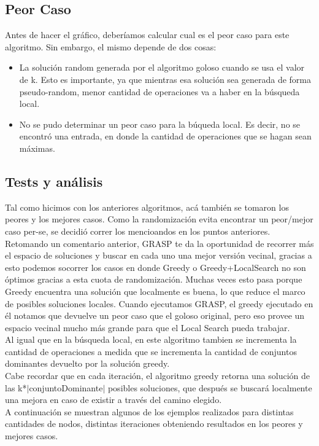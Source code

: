 \subsection{Peor Caso}
Antes de hacer el gráfico, deberíamos calcular cual es el peor caso para este algoritmo. Sin embargo, el mismo depende de dos cosas:
\begin{itemize}
\item La solución random generada por el algoritmo goloso cuando se usa el valor de k. 	Esto es importante, ya que mientras esa solución sea generada de forma pseudo-random, menor cantidad
	de operaciones va a haber en la búsqueda local.
\item No se pudo determinar un peor caso para la búqueda local. Es decir, no se encontró una entrada, en donde la
	cantidad de operaciones que se hagan sean máximas.
\end{itemize}

\subsection{Tests y análisis}
Tal como hicimos con los anteriores algoritmos, acá también se tomaron los peores y los mejores casos. Como la randomización evita encontrar un peor/mejor caso per-se, se 
decidió correr los mencioandos
en los puntos anteriores. Retomando un comentario anterior, GRASP te da la oportunidad de recorrer más el espacio de soluciones y buscar en cada uno una mejor versión vecinal, 
gracias a esto podemos socorrer los 
casos en donde Greedy o Greedy+LocalSearch no son óptimos gracias a esta cuota de randomización. Muchas veces esto pasa porque Greedy encuentra una solución que localmente es 
buena, lo que reduce el marco 
de posibles soluciones locales. Cuando ejecutamos GRASP, el greedy ejecutado en él notamos que devuelve un peor caso que el goloso original, pero eso provee un espacio vecinal 
mucho más grande para que el Local
Search pueda trabajar. \\
Al igual que en la búsqueda local, en este algoritmo tambien se incrementa la cantidad de operaciones a medida
que se incrementa la cantidad de conjuntos dominantes devuelto por la solución greedy.\\
Cabe recordar que en cada iteración, el algoritmo greedy retorna una solución de las k*$|$conjuntoDominante$|$ posibles soluciones, que después se buscará localmente una mejora 
en caso de existir a través del camino elegido.\\
A continuación se muestran algunos de los ejemplos realizados para distintas cantidades de nodos, distintas iteraciones obteniendo resultados en los peores y mejores casos.


